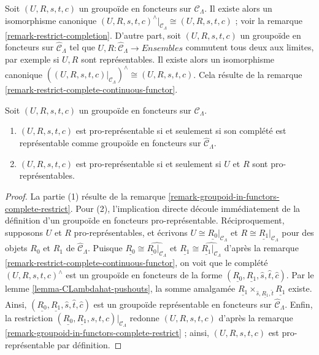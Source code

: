 \begin{remark}
\label{remark-groupoid-in-functors-complete-restrict}
Soit $(U, R, s, t, c)$ un groupoïde en foncteurs sur
$\mathcal{C}_\Lambda$. Il existe alors un isomorphisme canonique
$(U, R, s, t, c)^{\wedge}|_{\mathcal{C}_\Lambda} \cong (U, R, s, t, c)$ ; voir
la remarque \ref{remark-restrict-completion}. D'autre part, soit
$(U, R, s, t, c)$ un groupoïde en foncteurs sur
$\widehat{\mathcal{C}}_\Lambda$ tel que
$U, R : \widehat{\mathcal{C}}_\Lambda \to \textit{Ensembles}$
commutent tous deux aux limites, par exemple si $U, R$ sont représentables.
Il existe alors un isomorphisme canonique
$((U, R, s, t, c)|_{\mathcal{C}_\Lambda})^{\wedge} \cong (U, R, s, t, c)$.
Cela résulte de la remarque \ref{remark-restrict-complete-continuous-functor}.
\end{remark}

\begin{lemma}
\label{lemma-groupoid-in-functors-prorep-equivalences}
Soit $(U, R, s, t, c)$ un groupoïde en foncteurs sur
$\mathcal{C}_\Lambda$.
\begin{enumerate}
\item $(U, R, s, t, c)$ est pro-représentable si et seulement si son complété
est représentable comme groupoïde en foncteurs sur
$\widehat{\mathcal{C}}_\Lambda$.
\item $(U, R, s, t, c)$ est pro-représentable si et seulement si $U$ et $R$
sont pro-représentables.
\end{enumerate}
\end{lemma}

\begin{proof}
La partie (1) résulte de la remarque
\ref{remark-groupoid-in-functors-complete-restrict}. Pour (2), l'implication
directe découle immédiatement de la définition d'un groupoïde en foncteurs
pro-représentable. Réciproquement, supposons $U$ et $R$
pro-représentables, et écrivons $U \cong \underline{R_0}|_{\mathcal{C}_\Lambda}$ et
$R \cong \underline{R_1}|_{\mathcal{C}_\Lambda}$ pour des objets $R_0$ et
$R_1$ de $\widehat{\mathcal{C}}_\Lambda$. Puisque
$\underline{R_0} \cong \widehat{\underline{R_0}|_{\mathcal{C}_\Lambda}}$ et
$\underline{R_1} \cong \widehat{\underline{R_1}|_{\mathcal{C}_\Lambda}}$
d'après la remarque \ref{remark-restrict-complete-continuous-functor}, on voit
que le complété $(U, R, s, t, c)^\wedge$ est un groupoïde en foncteurs de la
forme
$(\underline{R_0}, \underline{R_1}, \widehat{s}, \widehat{t}, \widehat{c})$.
Par le lemme \ref{lemma-CLambdahat-pushouts}, la somme amalgamée
$\underline{R_1} \times_{\widehat{s}, \underline{R_1}, \widehat{t}}
\underline{R_1}$ existe. Ainsi,
$(\underline{R_0}, \underline{R_1}, \widehat{s}, \widehat{t}, \widehat{c})$
est un groupoïde représentable en foncteurs sur
$\widehat{\mathcal{C}}_\Lambda$. Enfin, la restriction
$(\underline{R_0}, \underline{R_1}, s, t, c)|_{\mathcal{C}_\Lambda}$
redonne $(U, R, s, t, c)$ d'après la remarque
\ref{remark-groupoid-in-functors-complete-restrict} ; ainsi,
$(U, R, s, t, c)$ est pro-représentable par définition.
\end{proof}






